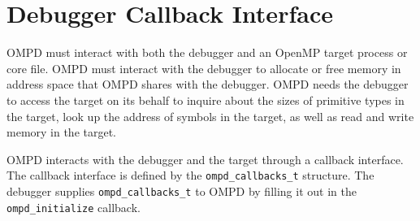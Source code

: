 \section{Debugger Callback Interface}
\label{sec:ompd_data_types}

OMPD must interact with both the debugger and an OpenMP target process or core 
file. OMPD must interact with the debugger to allocate or free memory in 
address space that OMPD shares with the debugger. OMPD needs the debugger to 
access the target on its behalf to inquire about the sizes of primitive types 
in the target, look up the address of symbols in the target, as well as read 
and write memory in the target. 

OMPD interacts with the debugger and the target through a callback interface.
The callback interface  is defined by the \verb|ompd_callbacks_t| structure.
The debugger  supplies \verb|ompd_callbacks_t| to OMPD by filling it out
in the \verb|ompd_initialize| callback. 

\lstset{ %
	basicstyle=\footnotesize\ttfamily,
}

